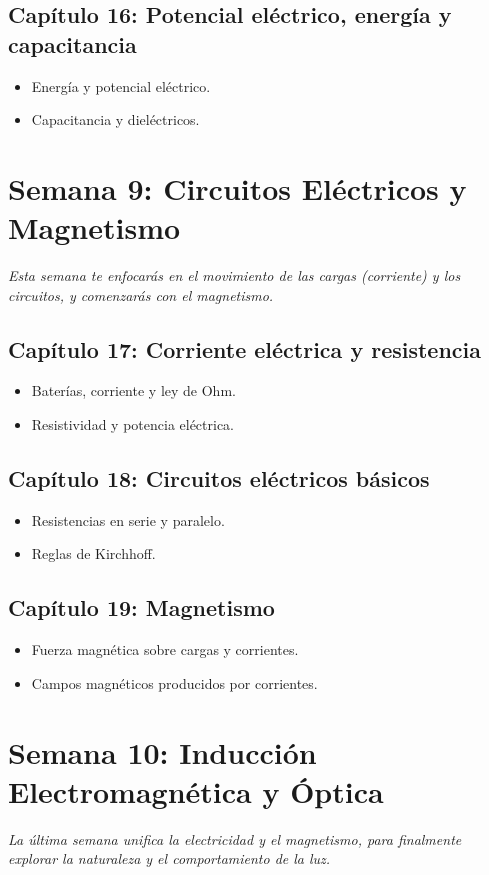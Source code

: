 \documentclass[12pt, a4paper]{article}
\begin{document}
\subsection*{Capítulo 16: Potencial eléctrico, energía y capacitancia}
\begin{itemize}[leftmargin=*]
    \item Energía y potencial eléctrico.
    \item Capacitancia y dieléctricos.
\end{itemize}

\section*{Semana 9: Circuitos Eléctricos y Magnetismo}
\textit{Esta semana te enfocarás en el movimiento de las cargas (corriente) y los circuitos, y comenzarás con el magnetismo.}
\subsection*{Capítulo 17: Corriente eléctrica y resistencia}
\begin{itemize}[leftmargin=*]
    \item Baterías, corriente y ley de Ohm.
    \item Resistividad y potencia eléctrica.
\end{itemize}
\subsection*{Capítulo 18: Circuitos eléctricos básicos}
\begin{itemize}[leftmargin=*]
    \item Resistencias en serie y paralelo.
    \item Reglas de Kirchhoff.
\end{itemize}
\subsection*{Capítulo 19: Magnetismo}
\begin{itemize}[leftmargin=*]
    \item Fuerza magnética sobre cargas y corrientes.
    \item Campos magnéticos producidos por corrientes.
\end{itemize}

\section*{Semana 10: Inducción Electromagnética y Óptica}
\textit{La última semana unifica la electricidad y el magnetismo, para finalmente explorar la naturaleza y el comportamiento de la luz.}
\end{document}
